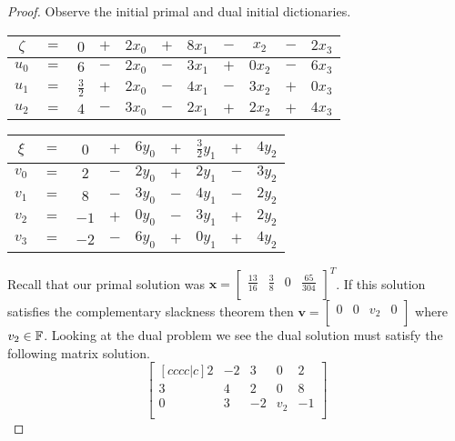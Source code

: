 \documentclass[12pt,oneside]{amsart}
\numberwithin{equation}{section}
\numberwithin{figure}{section}
\theoremstyle{plain}
\theoremstyle{definition}
\newcommand{\F}{\ensuremath \mathbb{F}}
\begin{document}
\begin{proof}
  Observe the initial primal and dual initial dictionaries. \\ 
  \begin{center}\begin{tabular}{|ccccccccccc|}
    \hline
    $\zeta$ & $=$ & $0$           & $+$ & $2x_0$ & $+$ & $8x_1$ & $-$ & $x_2$  & $-$ & $2x_3$ \\
    \hline
    $u_0$   & $=$ & $6$           & $-$ & $2x_0$ & $-$ & $3x_1$ & $+$ & $0x_2$ & $-$ & $6x_3$ \\
    $u_1$   & $=$ & $\frac{3}{2}$ & $+$ & $2x_0$ & $-$ & $4x_1$ & $-$ & $3x_2$ & $+$ & $0x_3$ \\
    $u_2$   & $=$ & $4$           & $-$ & $3x_0$ & $-$ & $2x_1$ & $+$ & $2x_2$ & $+$ & $4x_3$ \\
    \hline
  \end{tabular}\quad\begin{tabular}{|ccccccccc|}
    \hline
    $\xi$ & $=$ & $0$  & $+$ & $6y_0$ & $+$ & $\frac{3}{2}y_1$ & $+$ & $4y_2$ \\
    \hline
    $v_0$ & $=$ & $2$  & $-$ & $2y_0$ & $+$ & $2y_1$ & $-$ & $3y_2$ \\
    $v_1$ & $=$ & $8$  & $-$ & $3y_0$ & $-$ & $4y_1$ & $-$ & $2y_2$ \\
    $v_2$ & $=$ & $-1$ & $+$ & $0y_0$ & $-$ & $3y_1$ & $+$ & $2y_2$ \\
    $v_3$ & $=$ & $-2$ & $-$ & $6y_0$ & $+$ & $0y_1$ & $+$ & $4y_2$ \\
    \hline
  \end{tabular}\end{center}
  Recall that our primal solution was $\mathbf{x} = \begin{bmatrix}
  \frac{13}{16} & \frac{3}{8} & 0 & \frac{65}{304} \\ \end{bmatrix}^T$. If this 
  solution satisfies the complementary slackness theorem then $\mathbf{v} = 
  \begin{bmatrix}
  0 & 0 & v_2 & 0 \\
  \end{bmatrix}$ where $v_2 \in \F$. Looking at the dual problem we see the dual 
  solution must satisfy the following matrix solution. \\
  \[\begin{bmatrix}[cccc|c]
    2 & -2 & 3  & 0   & 2  \\
    3 & 4  & 2  & 0   & 8  \\
    0 & 3  & -2 & v_2 & -1 \\

\end{bmatrix}\]
\end{proof}
\end{document}
